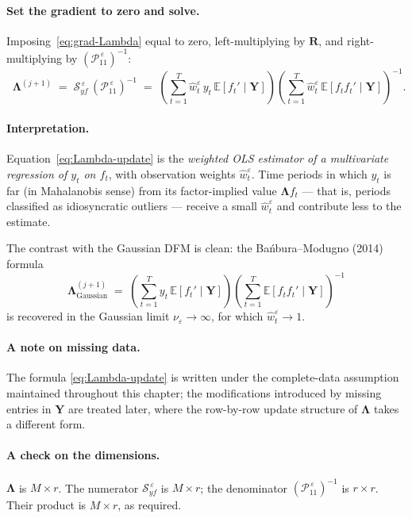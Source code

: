 \documentclass[11pt, a4paper, oneside]{article}
\newcommand{\mY}{\mathbf{Y}}
\newcommand{\mL}{\boldsymbol{\Lambda}}
\newcommand{\mR}{\mathbf{R}}
\begin{document}
\paragraph{Set the gradient to zero and solve.}
Imposing~\eqref{eq:grad-Lambda} equal to zero, left-multiplying by
$\mR$, and right-multiplying by $(\mathcal{P}_{11}^{\,\varepsilon})^{-1}$:
\begin{equation}
\boxed{\;\;
\mL^{(j+1)} \;=\; \mathcal{S}_{yf}^{\,\varepsilon}\, (\mathcal{P}_{11}^{\,\varepsilon})^{-1}
\;=\; \left(\sum_{t=1}^{T} \hat{w}^\varepsilon_t\, y_t\, \mathbb{E}[f_t' \mid \mY]\right)
\left(\sum_{t=1}^{T} \hat{w}^\varepsilon_t\, \mathbb{E}[f_t f_t' \mid \mY]\right)^{-1}.
\;\;}
\label{eq:Lambda-update}
\end{equation}

\paragraph{Interpretation.}
Equation~\eqref{eq:Lambda-update} is the \emph{weighted OLS estimator
of a multivariate regression of $y_t$ on $f_t$}, with observation
weights $\hat{w}^\varepsilon_t$. Time periods in which $y_t$ is far
(in Mahalanobis sense) from its factor-implied value $\mL f_t$
— that is, periods classified as idiosyncratic outliers — receive a
small $\hat{w}^\varepsilon_t$ and contribute less to the estimate.

The contrast with the Gaussian DFM is clean: the Bańbura–Modugno
(2014) formula
\[
\mL^{(j+1)}_{\text{Gaussian}} \;=\; \left(\sum_{t=1}^{T} y_t\, \mathbb{E}[f_t' \mid \mY]\right)
\left(\sum_{t=1}^{T} \mathbb{E}[f_t f_t' \mid \mY]\right)^{-1}
\]
is recovered in the Gaussian limit $\nu_\varepsilon \to \infty$, for
which $\hat{w}^\varepsilon_t \to 1$.

\paragraph{A note on missing data.}
The formula \eqref{eq:Lambda-update} is written under the
complete-data assumption maintained throughout this chapter; the
modifications introduced by missing entries in $\mY$ are treated later, where the row-by-row update structure
of $\mL$ takes a different form.

\paragraph{A check on the dimensions.}
$\mL$ is $M \times r$. The numerator
$\mathcal{S}_{yf}^{\,\varepsilon}$ is $M \times r$; the denominator
$(\mathcal{P}_{11}^{\,\varepsilon})^{-1}$ is $r \times r$. Their product
is $M \times r$, as required.
\end{document}
